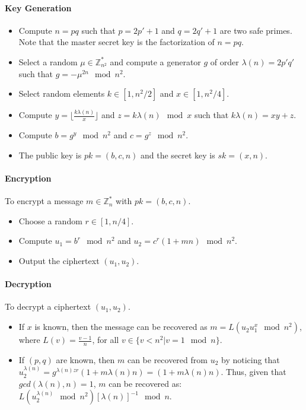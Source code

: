 \documentclass[a4paper,11pt]{article}
\begin{document}
\paragraph{Key Generation}
    \begin{itemize}
      \item Compute $n=pq$ such that $p=2p'+1$ and $q=2q'+1$ are two safe primes.
      Note that the master secret key is the factorization of $n = pq$.
      \item Select a random $\mu \in \mathbb{Z}_{n^{2}}^{*}$ and compute a generator $g$ of order $\lambda(n)=2p'q'$ such that $g=-\mu^{2n} \mod n^{2}$.
      \item Select random elements $k \in [1,n^{2}/2]$ and $x \in [1,n^{2}/4]$.
      \item Compute $y=\lfloor\frac{k\lambda(n)}{x}\rfloor$ and $z=k\lambda(n) \mod x$ such that $k\lambda(n)=xy+z$.
      \item Compute $b=g^{y}\mod n^{2}$ and $c=g^{z}\mod n^{2}$.
      \item The public key is $pk=(b,c,n)$ and the secret key is $sk=(x,n)$.
    \end{itemize}

\paragraph{Encryption}
     To encrypt a message $m \in \mathbb{Z}_{n}^{*}$ with $pk = (b,c,n)$.
    \begin{itemize}
      \item Choose a random $r \in [1, n/4]$.
      \item Compute $u_{1}=b^{r} \mod n^{2}$ and $u_{2}=c^{r}(1+mn) \mod n^{2}$.
      \item Output the ciphertext $(u_{1}, u_{2})$.
    \end{itemize}

\paragraph{Decryption}
    To decrypt a ciphertext $(u_{1}, u_{2})$.
    \begin{itemize}
      \item If $x$ is known, then the message can be recovered as $m=L(u_{2}u_{1}^{x} \mod n^{2})$, where $L(v)=\frac{v-1}{n}$, for all $v \in \{v < n^{2} | v=1 \mod n \}$.
      \item If $(p,q)$ are known, then $m$ can be recovered from $u_{2}$ by noticing that $u_{2}^{\lambda(n)}=g^{\lambda(n)zr}(1+m\lambda(n)n)=(1+m\lambda(n)n)$. Thus, given that $gcd(\lambda(n),n) = 1$, $m$ can be recovered as: $L(u_{2}^{\lambda(n)}\mod n^{2})[\lambda(n)]^{-1}\mod n$.
    \end{itemize}
\end{document}
